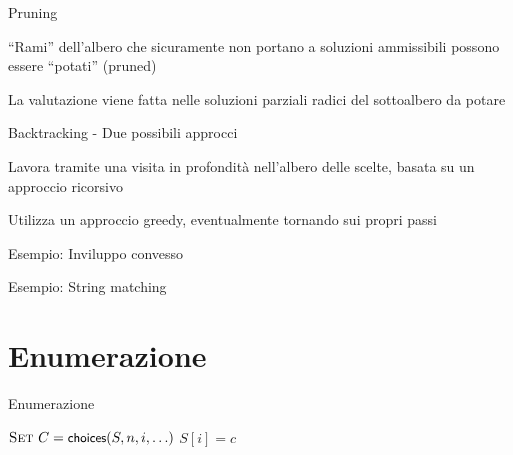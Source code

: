 \begin{frame}{Pruning}

\BI
\item “Rami” dell'albero che sicuramente non portano a soluzioni ammissibili possono essere “\alert{potati}”  (\alert{pruned})
\item La valutazione viene fatta nelle soluzioni parziali radici del sottoalbero da potare
\EI

\begin{overprint}
\centerline{}
\centerline{}
\end{overprint}

\end{frame}

\begin{frame}{Backtracking - Due possibili approcci}

\BIL
\item Lavora tramite una visita in profondità nell'albero delle scelte, basata su un approccio ricorsivo
\EIL

\medskip
{} 
\BIL
\item Utilizza un approccio greedy, eventualmente tornando sui propri passi
\item Esempio: \alert{Inviluppo convesso}
\item Esempio: \alert{String matching}
\EIL

\end{frame}

\section{Enumerazione}


\begin{frame}{Enumerazione}

\begin{Procedure}
\caption[A]{\BOOLEAN\ \enumerazione($\Item[\,]\ S$, \INTEGER $n$, \INTEGER\ $i$, \mldots)}
$\textsc{Set}\ C = \textsf{{\small choices}}(S, n, i, \ldots)$
{
  $S[i] = c$\;
  {
  }
}
\Return \FALSE\;
\end{Procedure}

\end{frame}

